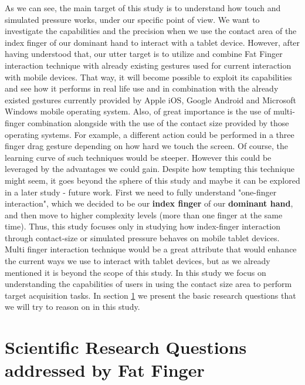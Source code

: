 As we can see, the main target of this study is to understand how touch and simulated pressure works, under our specific point of view. We want to investigate the capabilities and the precision when we use the contact area of the index finger of our dominant hand to interact with a tablet device. However, after having understood that, our utter target is to utilize and combine Fat Finger interaction technique with already existing gestures used for current interaction with mobile devices. 
That way, it will become possible to exploit its capabilities and see how it performs in real life use and in combination with the already existed gestures currently provided by Apple iOS, Google Android and Microsoft Windows mobile operating system.
Also, of great importance is the use of multi-finger combination alongside with the use of the contact size provided by those operating systems. For example, a different action could be performed in a three finger drag gesture depending on how hard we touch the screen. 
Of course, the learning curve of such techniques would be steeper. However this could be leveraged by the advantages we could gain. Despite how tempting this technique might seem, it goes beyond the sphere of this study and maybe it can be explored in a later study - future work. 
First we need to fully understand "one-finger interaction", which we decided to be our \textbf{index finger} of our \textbf{dominant hand}, and then move to higher complexity levels (more than one finger at the same time).
Thus, this study focuses only in studying how index-finger interaction through contact-size or simulated pressure behaves on mobile tablet devices. Multi finger interaction technique would be a great attribute that would enhance the current ways we use to interact with tablet devices, but as we already mentioned it is beyond the scope of this study.
In this study we focus on understanding the capabilities of users in using the contact size area to perform target acquisition tasks. In section \ref{sec:FFResearchQuestions} we present the basic research questions that we will try to reason on in this study.



\section{Scientific Research Questions addressed by Fat Finger}
\label{sec:FFResearchQuestions}

